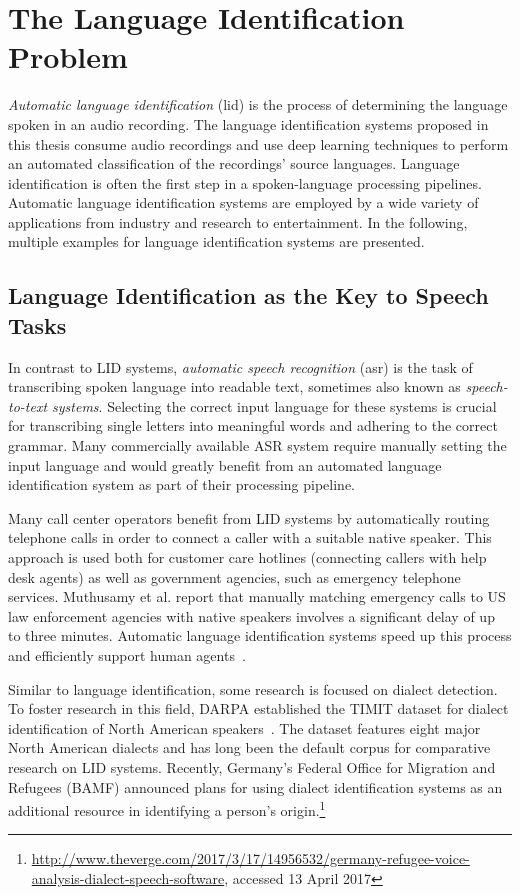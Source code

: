 \section{The Language Identification Problem}
\label{sec:lid}

\emph{Automatic language identification} (\ac{lid}) is the process of determining the language spoken in an audio recording. The language identification systems proposed in this thesis consume audio recordings and use deep learning techniques to perform an automated classification of the recordings' source languages.
Language identification is often the first step in a spoken-language processing pipelines. Automatic language identification systems are employed by a wide variety of applications from industry and research to entertainment.
In the following, multiple examples for language identification systems are presented.

\subsection{Language Identification as the Key to Speech Tasks}
In contrast to LID systems, \emph{automatic speech recognition} (\ac{asr}) is the task of transcribing spoken language into readable text, sometimes also known as \emph{speech-to-text systems}. Selecting the correct input language for these systems is crucial for transcribing single letters into meaningful words and adhering to the correct grammar. Many commercially available ASR system require manually setting the input language and would greatly benefit from an automated language identification system as part of their processing pipeline.

Many call center operators benefit from LID systems by automatically routing telephone calls in order to connect a caller with a suitable native speaker. This approach is used both for customer care hotlines (connecting callers with help desk agents) as well as government agencies, such as emergency telephone services. Muthusamy et al. report that manually matching emergency calls to US law enforcement agencies with native speakers involves a significant delay of up to three minutes. Automatic language identification systems speed up this process and efficiently support human agents~\cite{muthusamy1994reviewing}.

Similar to language identification, some research is focused on dialect detection. To foster research in this field, DARPA established the TIMIT dataset for dialect identification of North American speakers~\cite{garofolo1993darpa}. The dataset features eight major North American dialects and has long been the default corpus for comparative research on LID systems.
Recently, Germany's Federal Office for Migration and Refugees (BAMF) announced plans for using dialect identification systems as an additional resource in identifying a person's origin.\footnote{\url{http://www.theverge.com/2017/3/17/14956532/germany-refugee-voice-analysis-dialect-speech-software}, accessed 13 April 2017}

